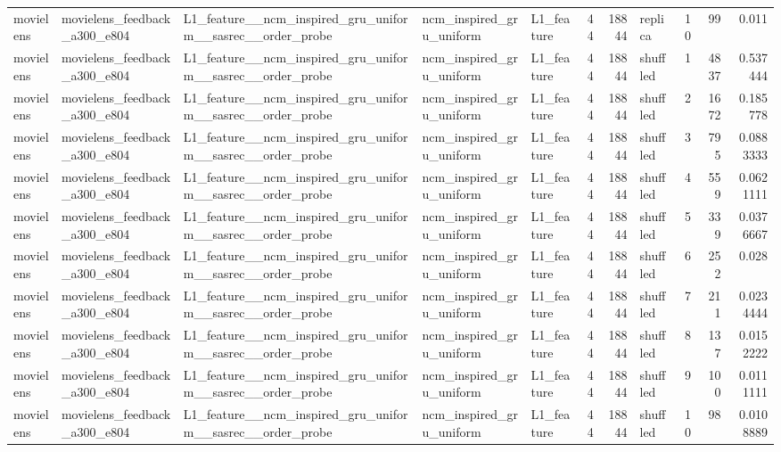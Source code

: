 \begin{table}[htbp!]
\begin{tabular}{lllllrrlrrr}
movielens & movielens\_feedback\_a300\_e804 & L1\_feature\_\_ncm\_inspired\_gru\_uniform\_\_sasrec\_\_order\_probe & ncm\_inspired\_gru\_uniform & L1\_feature & 44 & 18844 & replica & 10 & 99 & 0.011 \\
movielens & movielens\_feedback\_a300\_e804 & L1\_feature\_\_ncm\_inspired\_gru\_uniform\_\_sasrec\_\_order\_probe & ncm\_inspired\_gru\_uniform & L1\_feature & 44 & 18844 & shuffled & 1 & 4837 & 0.537444 \\
movielens & movielens\_feedback\_a300\_e804 & L1\_feature\_\_ncm\_inspired\_gru\_uniform\_\_sasrec\_\_order\_probe & ncm\_inspired\_gru\_uniform & L1\_feature & 44 & 18844 & shuffled & 2 & 1672 & 0.185778 \\
movielens & movielens\_feedback\_a300\_e804 & L1\_feature\_\_ncm\_inspired\_gru\_uniform\_\_sasrec\_\_order\_probe & ncm\_inspired\_gru\_uniform & L1\_feature & 44 & 18844 & shuffled & 3 & 795 & 0.0883333 \\
movielens & movielens\_feedback\_a300\_e804 & L1\_feature\_\_ncm\_inspired\_gru\_uniform\_\_sasrec\_\_order\_probe & ncm\_inspired\_gru\_uniform & L1\_feature & 44 & 18844 & shuffled & 4 & 559 & 0.0621111 \\
movielens & movielens\_feedback\_a300\_e804 & L1\_feature\_\_ncm\_inspired\_gru\_uniform\_\_sasrec\_\_order\_probe & ncm\_inspired\_gru\_uniform & L1\_feature & 44 & 18844 & shuffled & 5 & 339 & 0.0376667 \\
movielens & movielens\_feedback\_a300\_e804 & L1\_feature\_\_ncm\_inspired\_gru\_uniform\_\_sasrec\_\_order\_probe & ncm\_inspired\_gru\_uniform & L1\_feature & 44 & 18844 & shuffled & 6 & 252 & 0.028 \\
movielens & movielens\_feedback\_a300\_e804 & L1\_feature\_\_ncm\_inspired\_gru\_uniform\_\_sasrec\_\_order\_probe & ncm\_inspired\_gru\_uniform & L1\_feature & 44 & 18844 & shuffled & 7 & 211 & 0.0234444 \\
movielens & movielens\_feedback\_a300\_e804 & L1\_feature\_\_ncm\_inspired\_gru\_uniform\_\_sasrec\_\_order\_probe & ncm\_inspired\_gru\_uniform & L1\_feature & 44 & 18844 & shuffled & 8 & 137 & 0.0152222 \\
movielens & movielens\_feedback\_a300\_e804 & L1\_feature\_\_ncm\_inspired\_gru\_uniform\_\_sasrec\_\_order\_probe & ncm\_inspired\_gru\_uniform & L1\_feature & 44 & 18844 & shuffled & 9 & 100 & 0.0111111 \\
movielens & movielens\_feedback\_a300\_e804 & L1\_feature\_\_ncm\_inspired\_gru\_uniform\_\_sasrec\_\_order\_probe & ncm\_inspired\_gru\_uniform & L1\_feature & 44 & 18844 & shuffled & 10 & 98 & 0.0108889 \\

\end{tabular}
\end{table}
